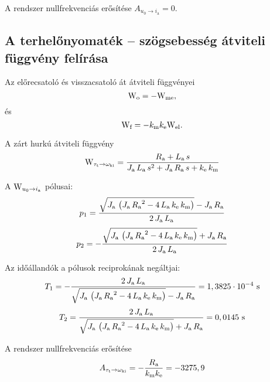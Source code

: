 A rendszer nullfrekvenciás erősítése $A_{u_0\rightarrow i_\text{a}} = 0$.


\subsection{A terhelőnyomaték -- szögsebesség átviteli függvény felírása}
\label{subsect:Wt-w}

Az előrecsatoló és visszacsatoló át átviteli függvényei
\begin{equation}
	\mathrm{W}_\text{o} = -\mathrm{W}_\text{me},
\end{equation} és 
\begin{equation}
	\mathrm{W}_\text{f} = -k_\text{m}k_\text{e}\mathrm{W}_\text{el}.
\end{equation}

A zárt hurkú átviteli függvény
\begin{equation}
	\mathrm{W}_{\tau_\text{t}\rightarrow\omega_\text{ki}} = 
	\frac{R_\text{a} + L_\text{a}\, s}{J_\text{a}\, L_\text{a}\, s^2 + J_\text{a}\, R_\text{a}\, s + k_\text{e}\, k_\text{m}}
\end{equation}

A $\mathrm{W}_{u_0\rightarrow i_\text{a}}$ pólusai:
\begin{equation}
	p_1 = \frac{\sqrt{J_\text{a}\, \left(J_\text{a}\, {R_\text{a}}^2 - 4\, L_\text{a}\, k_\text{e}\, k_\text{m}\right)} - J_\text{a}\, R_\text{a}}{2\, J_\text{a}\, L_\text{a}}
\end{equation}
\begin{equation}
	p_2 = -\frac{\sqrt{J_\text{a}\, \left(J_\text{a}\, {R_\text{a}}^2 - 4\, L_\text{a}\, k_\text{e}\, k_\text{m}\right)} + J_\text{a}\, R_\text{a}}{2\, J_\text{a}\, L_\text{a}}
\end{equation}

Az időállandók a pólusok reciprokának negáltjai:
\begin{equation}
	T_1 = -\frac{2\, J_\text{a}\, L_\text{a}}{\sqrt{J_\text{a}\, \left(J_\text{a}\, {R_\text{a}}^2 - 4\, L_\text{a}\, k_\text{e}\, k_\text{m}\right)} - J_\text{a}\, R_\text{a}} = 1,3825\cdot10^{-4}\text{ s}
\end{equation}
\begin{equation}
	T_2 = \frac{2\, J_\text{a}\, L_\text{a}}{\sqrt{J_\text{a}\, \left(J_\text{a}\, {R_\text{a}}^2 - 4\, L_\text{a}\, k_\text{e}\, k_\text{m}\right)} + J_\text{a}\, R_\text{a}} = 0,0145\text{ s}
\end{equation}

A rendszer nullfrekvenciás erősítése
\begin{equation}
	A_{\tau_\text{t}\rightarrow\omega_\text{ki}} =
	- \frac{R_\text{a}}{k_\text{m}k_\text{e}} = -3275,9
\end{equation}



